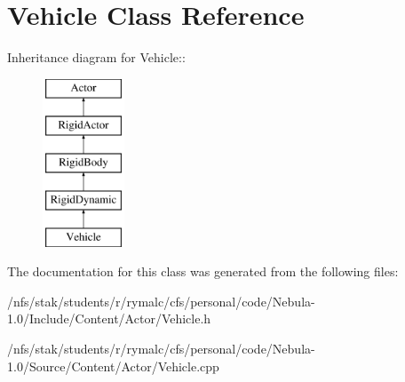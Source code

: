 \hypertarget{classVehicle}{
\section{Vehicle Class Reference}
\label{classVehicle}
}
Inheritance diagram for Vehicle::\begin{figure}[H]
\begin{center}
\leavevmode
\includegraphics[height=5cm]{classVehicle}
\end{center}
\end{figure}


The documentation for this class was generated from the following files:\begin{DoxyCompactItemize}
\item 
/nfs/stak/students/r/rymalc/cfs/personal/code/Nebula-\/1.0/Include/Content/Actor/Vehicle.h\item 
/nfs/stak/students/r/rymalc/cfs/personal/code/Nebula-\/1.0/Source/Content/Actor/Vehicle.cpp\end{DoxyCompactItemize}
